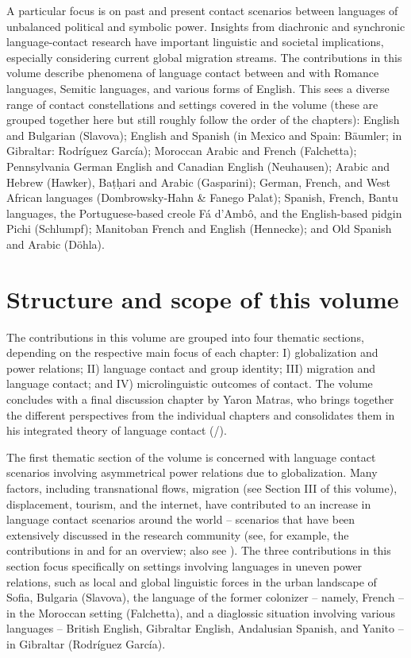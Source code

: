 \documentclass[output=paper
		  ]{langscibook}
\begin{document}
A particular focus is on past and present contact scenarios between languages of unbalanced political and symbolic power. Insights from diachronic and synchronic language-contact research have important linguistic and societal implications, especially considering current global migration streams. The contributions in this volume describe phenomena of language contact between and with Romance languages, Semitic languages, and various forms of English. This sees a diverse range of contact constellations and settings covered in the volume (these are grouped together here but still roughly follow the order of the chapters): English and Bulgarian (Slavova); English and Spanish (in Mexico and Spain: Bäumler; in Gibraltar: Rodríguez García); Moroccan Arabic and French (Falchetta); Pennsylvania German English and Canadian English (Neuhausen); Arabic and Hebrew (Hawker), Baṭḥari and Arabic (Gasparini); German, French, and West African languages (Dombrowsky-Hahn \& Fanego Palat); Spanish, French, Bantu languages, the Portuguese-based creole Fá d’Ambô, and the English-based pidgin Pichi (Schlumpf); Manitoban French and English (Hennecke); and Old Spanish and Arabic (Döhla). 

\section{Structure and scope of this volume}

The contributions in this volume are grouped into four thematic sections, depending on the respective main focus of each chapter: I) globalization and power relations; II) language contact and group identity; III) migration and language contact; and IV) microlinguistic outcomes of contact. The volume concludes with a final discussion chapter by Yaron Matras, who brings together the different perspectives from the individual chapters and consolidates them in his integrated theory of language contact (\citealt{matras_language_2009}/\citeyear{matras_language_2020}).

The first thematic section of the volume is concerned with language contact scenarios involving asymmetrical power relations due to globalization. Many factors, including transnational flows, migration (see Section III of this volume), displacement, tourism, and the internet, have contributed to an increase in language contact scenarios around the world – scenarios that have been extensively discussed in the research community (see, for example, the contributions in \citealt{collins_globalization_2009} and \citealt{coupland_handbook_2010} for an overview; also see \citealt{blommaert_sociolinguistics_2010}). The three contributions in this section focus specifically on settings involving languages in uneven power relations, such as local and global linguistic forces in the urban landscape of Sofia, Bulgaria (Slavova), the language of the former colonizer – namely, French – in the Moroccan setting (Falchetta), and a diaglossic situation involving various languages – British English, Gibraltar English, Andalusian Spanish, and Yanito – in Gibraltar (Rodríguez García).
\end{document}
